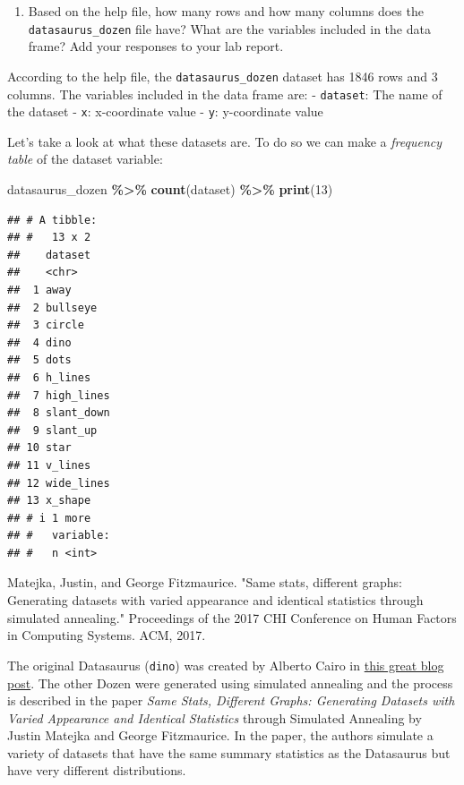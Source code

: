 \documentclass[
]{article}
\newenvironment{Shaded}{\begin{snugshade}}{\end{snugshade}}
\newcommand{\DecValTok}[1]{\textcolor[rgb]{0.00,0.00,0.81}{#1}}
\newcommand{\FunctionTok}[1]{\textcolor[rgb]{0.13,0.29,0.53}{\textbf{#1}}}
\newcommand{\NormalTok}[1]{#1}
\newcommand{\SpecialCharTok}[1]{\textcolor[rgb]{0.81,0.36,0.00}{\textbf{#1}}}
\providecommand{\tightlist}{%
  \setlength{\itemsep}{0pt}\setlength{\parskip}{0pt}}
\begin{document}
\begin{enumerate}
\def\labelenumi{\arabic{enumi}.}
\tightlist
\item
  Based on the help file, how many rows and how many columns does the
  \texttt{datasaurus\_dozen} file have? What are the variables included
  in the data frame? Add your responses to your lab report.
\end{enumerate}

According to the help file, the \texttt{datasaurus\_dozen} dataset has
1846 rows and 3 columns. The variables included in the data frame are: -
\texttt{dataset}: The name of the dataset - \texttt{x}: x-coordinate
value - \texttt{y}: y-coordinate value

Let's take a look at what these datasets are. To do so we can make a
\emph{frequency table} of the dataset variable:

\begin{Shaded}
\begin{Highlighting}[]
\NormalTok{datasaurus\_dozen }\SpecialCharTok{\%\textgreater{}\%}
  \FunctionTok{count}\NormalTok{(dataset) }\SpecialCharTok{\%\textgreater{}\%}
  \FunctionTok{print}\NormalTok{(}\DecValTok{13}\NormalTok{)}
\end{Highlighting}
\end{Shaded}

\begin{verbatim}
## # A tibble:
## #   13 x 2
##    dataset   
##    <chr>     
##  1 away      
##  2 bullseye  
##  3 circle    
##  4 dino      
##  5 dots      
##  6 h_lines   
##  7 high_lines
##  8 slant_down
##  9 slant_up  
## 10 star      
## 11 v_lines   
## 12 wide_lines
## 13 x_shape   
## # i 1 more
## #   variable:
## #   n <int>
\end{verbatim}

\begin{Shaded}
\begin{Highlighting}[]
\NormalTok{Matejka, Justin, and George Fitzmaurice. "Same stats, different graphs: Generating datasets with varied appearance and identical statistics through simulated annealing." Proceedings of the 2017 CHI Conference on Human Factors in Computing Systems. ACM, 2017.}
\end{Highlighting}
\end{Shaded}

The original Datasaurus (\texttt{dino}) was created by Alberto Cairo in
\href{http://www.thefunctionalart.com/2016/08/download-datasaurus-never-trust-summary.html}{this
great blog post}. The other Dozen were generated using simulated
annealing and the process is described in the paper \emph{Same Stats,
Different Graphs: Generating Datasets with Varied Appearance and
Identical Statistics} through Simulated Annealing by Justin Matejka and
George Fitzmaurice. In the paper, the authors simulate a variety of
datasets that have the same summary statistics as the Datasaurus but
have very different distributions.
\end{document}
